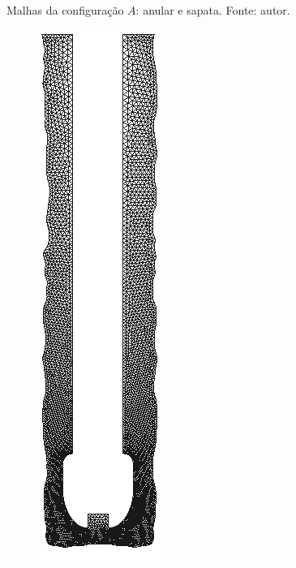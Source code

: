 \begin{figure}[H]
	\caption[Malhas da configuração $A$: anular e sapata.]{Malhas da configuração $A$: anular e sapata. Fonte: autor.}
	\label{fig:malha_A_B}
\end{figure}

\begin{figure}[H]
	\centering
	\begin{subfigure}[b]{0.1\linewidth}
		\includegraphics[width=\linewidth]{img/rugosa.png}

\end{subfigure}
\end{figure}
